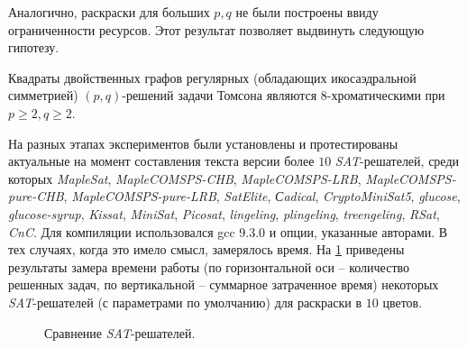 Аналогично, раскраски для больших $p,q$ не были построены ввиду ограниченности ресурсов. 
Этот результат позволяет выдвинуть следующую гипотезу.

\begin{hypothesis}
Квадраты двойственных графов регулярных (обладающих икосаэдральной симметрией) $(p,q)$-решений задачи Томсона  
являются $8$-хроматическими при $p \ge 2, q \ge 2$.
\end{hypothesis}

На разных этапах экспериментов были установлены и протестированы актуальные на момент составления текста 
версии более $10$ \textit{SAT}-решателей, среди которых
\textit{MapleSat},
\textit{Maple\-COM\-SPS-CHB},
\textit{Maple\-COM\-SPS-LRB},
\textit{Maple\-COM\-SPS-pure-CHB},
\textit{Maple\-COM\-SPS-pure-LRB},
\textit{Sat\-Elite},
\textit{Сadical},
\textit{Crypto\-Mini\-Sat5},
\textit{glu\-co\-se},
\textit{glucose-syrup},
\textit{Kissat},
\textit{Mini\-Sat},
\textit{Picosat},
\textit{lin\-ge\-ling},
\textit{plin\-ge\-ling},
\textit{treen\-ge\-ling},
\textit{RSat},
\textit{CnC}. 
Для компиляции использовался gcc 9.3.0 и опции, указанные авторами. 
В тех случаях, когда это имело смысл, замерялось время. 
На \figurename{ \ref{chapter3:fig:cactus_10}} приведены результаты замера времени работы 
(по горизонтальной оси -- количество решенных задач, по вертикальной -- суммарное затраченное время)
некоторых \textit{SAT}-решателей (с параметрами по умолчанию) для раскраски в $10$ цветов.

\begin{figure}[h]
\centering
\captionsetup{justification=centering}
\caption{Сравнение \textit{SAT}-решателей.}
\label{chapter3:fig:cactus_10}
\end{figure}

